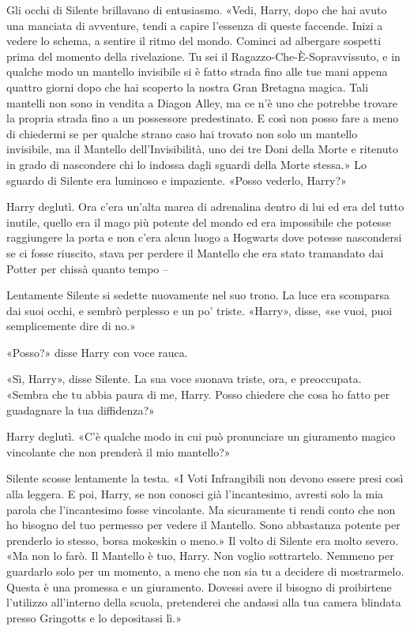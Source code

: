 Gli occhi di Silente brillavano di entusiasmo. «Vedi, Harry, dopo che hai avuto una manciata di avventure, tendi a capire l’essenza di queste faccende. Inizi a vedere lo schema, a sentire il ritmo del mondo. Cominci ad albergare sospetti prima del momento della rivelazione. Tu sei il Ragazzo-Che-È-Sopravvissuto, e in qualche modo un mantello invisibile si è fatto strada fino alle tue mani appena quattro giorni dopo che hai scoperto la nostra Gran Bretagna magica. Tali mantelli non sono in vendita a Diagon Alley, ma ce n’è uno che potrebbe trovare la propria strada fino a un possessore predestinato. E così non posso fare a meno di chiedermi se per qualche strano caso hai trovato non solo un mantello invisibile, ma il Mantello dell’Invisibilità, uno dei tre Doni della Morte e ritenuto in grado di nascondere chi lo indossa dagli sguardi della Morte stessa.» Lo sguardo di Silente era luminoso e impaziente. «Posso vederlo, Harry?»

Harry deglutì. Ora c’era un’alta marea di adrenalina dentro di lui ed era del tutto inutile, quello era il mago più potente del mondo ed era impossibile che potesse raggiungere la porta e non c’era alcun luogo a Hogwarts dove potesse nascondersi se ci fosse riuscito, stava per perdere il Mantello che era stato tramandato dai Potter per chissà quanto tempo –

Lentamente Silente si sedette nuovamente nel suo trono. La luce era scomparsa dai suoi occhi, e sembrò perplesso e un po’ triste. «Harry», disse, «se vuoi, puoi semplicemente dire di no.»

«Posso?» disse Harry con voce rauca.

«Sì, Harry», disse Silente. La sua voce suonava triste, ora, e preoccupata. «Sembra che tu abbia paura di me, Harry. Posso chiedere che cosa ho fatto per guadagnare la tua diffidenza?»

Harry deglutì. «C’è qualche modo in cui può pronunciare un giuramento magico vincolante che non prenderà il mio mantello?»

Silente scosse lentamente la testa. «I Voti Infrangibili non devono essere presi così alla leggera. E poi, Harry, se non conosci già l’incantesimo, avresti solo la mia parola che l’incantesimo fosse vincolante. Ma sicuramente ti rendi conto che non ho bisogno del tuo permesso per vedere il Mantello. Sono abbastanza potente per prenderlo io stesso, borsa mokeskin o meno.» Il volto di Silente era molto severo. «Ma non lo farò. Il Mantello è tuo, Harry. Non voglio sottrartelo. Nemmeno per guardarlo solo per un momento, a meno che non sia tu a decidere di mostrarmelo. Questa è una promessa e un giuramento. Dovessi avere il bisogno di proibirtene l’utilizzo all’interno della scuola, pretenderei che andassi alla tua camera blindata presso Gringotts e lo depositassi lì.»

